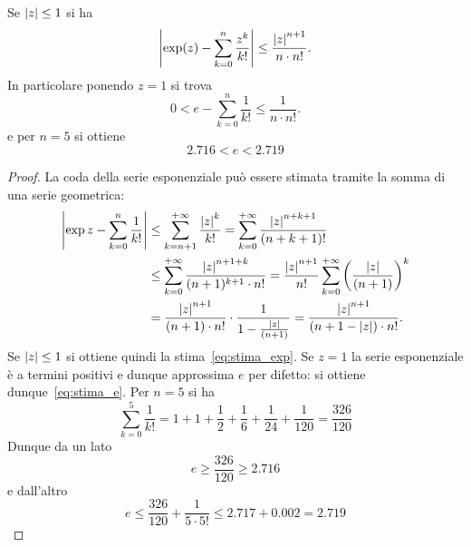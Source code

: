 \begin{theorem}
  \label{th:approx_exp}%
  \label{th:approx_e}%
  Se ${\left|z\right|}\le 1$ si ha 
  \begin{equation}\label{eq:stima_exp}
    {\left|\exp(z) - \sum_{k=0}^n \frac{z^k}{k!}\right|}
    \le \frac{{\left|z\right|}^{n+1}}{n\cdot n!}.
  \end{equation}
  In particolare ponendo $z=1$ si trova
  \begin{equation}\label{eq:stima_e}
     0 < e - \sum_{k=0}^n \frac{1}{k!} \le \frac{1}{n \cdot n!}.
  \end{equation}
  e per $n=5$ si ottiene
  \begin{equation}
    2.716 < e < 2.719
  \end{equation}
  \end{theorem}
  \begin{proof}
  La coda della serie esponenziale può essere stimata 
  tramite la somma di una serie geometrica:
  \begin{align*}
    {\left|\exp z - \sum_{k=0}^n \frac 1 {k!}\right|}
    & \le \sum_{k=n+1}^{+\infty} \frac{{\left|z\right|}^k}{k!} 
     = \sum_{k=0}^{+\infty}\frac{{\left|z\right|}^{n+k+1}}{(n+k+1)!} \\
    & \le \sum_{k=0}^{+\infty}\frac{{\left|z\right|}^{n+1+k}}{(n+1)^{k+1}\cdot n!}
     = \frac{{\left|z\right|}^{n+1}}{n!}\sum_{k=0}^{+\infty} {\left( \frac{{\left|z\right|}}{(n+1)} \right)}^k \\
    & = \frac{{\left|z\right|}^{n+1}}{(n+1)\cdot n!} \cdot \frac{1}{1-\frac{{\left|z\right|}}{(n+1)}} 
     = \frac{{\left|z\right|}^{n+1}}{(n+1-{\left|z\right|})\cdot n!}.
  \end{align*}
  Se ${\left|z\right|}\le 1$ si ottiene quindi la stima~\eqref{eq:stima_exp}.
  Se $z=1$ la serie esponenziale è a termini positivi e dunque 
  approssima $e$ per difetto: si ottiene dunque~\eqref{eq:stima_e}.
  Per $n=5$ si ha
  \[
   \sum_{k=0}^5 \frac{1}{k!} = 1 + 1 + \frac 1 2 + \frac{1}{6} + \frac {1}{24} + \frac{1}{120}
   = \frac{326}{120}
  \]
  Dunque da un lato
  \[
    e \ge \frac{326}{120} \ge 2.716
  \]
  e dall'altro
  \[
   e \le \frac{326}{120} + \frac{1}{5\cdot 5!}
     \le 2.717 + 0.002 = 2.719
  \]
\end{proof}
  
